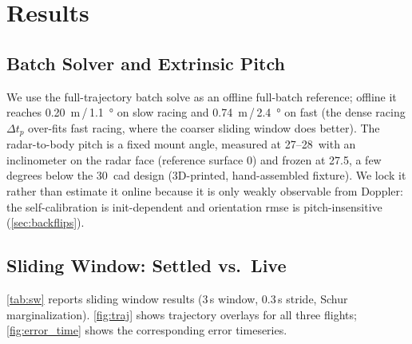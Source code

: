 \section{Results}
\label{sec:results}

\subsection{Batch Solver and Extrinsic Pitch}
We use the full-trajectory batch solve as an offline full-batch
reference; offline it reaches
\SI{0.20}{\metre}\,/\,\SI{1.1}{\degree} on slow racing and
\SI{0.74}{\metre}\,/\,\SI{2.4}{\degree} on fast (the dense racing
$\Delta t_p$ over-fits fast racing, where the coarser sliding window
does better).
The radar-to-body pitch is a fixed mount angle, measured at
27--28\degree\ with an inclinometer on the radar face (reference surface
0\degree) and frozen at 27.5\degree, a few degrees below the
30\degree\ \ac{cad} design (3D-printed, hand-assembled fixture).  We lock it
rather than estimate it online because it is only weakly observable from
Doppler: the self-calibration is init-dependent and orientation \ac{rmse} is
pitch-insensitive (\autoref{sec:backflips}).

\subsection{Sliding Window: Settled vs.\ Live}
\label{sec:sw_results}

\autoref{tab:sw} reports sliding window results
(3\,s window, 0.3\,s stride, Schur marginalization).
\autoref{fig:traj} shows trajectory overlays for all three flights;
\autoref{fig:error_time} shows the corresponding error timeseries.

